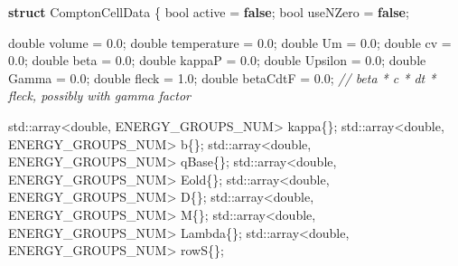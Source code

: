 \documentclass[
]{article}
\newenvironment{Shaded}{}{}
\newcommand{\BuiltInTok}[1]{\textcolor[rgb]{0.00,0.50,0.00}{#1}}
\newcommand{\CommentTok}[1]{\textcolor[rgb]{0.38,0.63,0.69}{\textit{#1}}}
\newcommand{\DataTypeTok}[1]{\textcolor[rgb]{0.56,0.13,0.00}{#1}}
\newcommand{\FloatTok}[1]{\textcolor[rgb]{0.25,0.63,0.44}{#1}}
\newcommand{\KeywordTok}[1]{\textcolor[rgb]{0.00,0.44,0.13}{\textbf{#1}}}
\newcommand{\NormalTok}[1]{#1}
\newcommand{\OperatorTok}[1]{\textcolor[rgb]{0.40,0.40,0.40}{#1}}
\begin{document}
\begin{Shaded}
\begin{Highlighting}[]
\KeywordTok{struct}\NormalTok{ ComptonCellData}
\OperatorTok{\{}
    \DataTypeTok{bool}\NormalTok{ active }\OperatorTok{=} \KeywordTok{false}\OperatorTok{;}
    \DataTypeTok{bool}\NormalTok{ useNZero }\OperatorTok{=} \KeywordTok{false}\OperatorTok{;}

    \DataTypeTok{double}\NormalTok{ volume }\OperatorTok{=} \FloatTok{0.0}\OperatorTok{;}
    \DataTypeTok{double}\NormalTok{ temperature }\OperatorTok{=} \FloatTok{0.0}\OperatorTok{;}
    \DataTypeTok{double}\NormalTok{ Um }\OperatorTok{=} \FloatTok{0.0}\OperatorTok{;}
    \DataTypeTok{double}\NormalTok{ cv }\OperatorTok{=} \FloatTok{0.0}\OperatorTok{;}
    \DataTypeTok{double}\NormalTok{ beta }\OperatorTok{=} \FloatTok{0.0}\OperatorTok{;}
    \DataTypeTok{double}\NormalTok{ kappaP }\OperatorTok{=} \FloatTok{0.0}\OperatorTok{;}
    \DataTypeTok{double}\NormalTok{ Upsilon }\OperatorTok{=} \FloatTok{0.0}\OperatorTok{;}
    \DataTypeTok{double}\NormalTok{ Gamma }\OperatorTok{=} \FloatTok{0.0}\OperatorTok{;}
    \DataTypeTok{double}\NormalTok{ fleck }\OperatorTok{=} \FloatTok{1.0}\OperatorTok{;}
    \DataTypeTok{double}\NormalTok{ betaCdtF }\OperatorTok{=} \FloatTok{0.0}\OperatorTok{;}      \CommentTok{// beta * c * dt * fleck, possibly with gamma factor}

    \BuiltInTok{std::}\NormalTok{array}\OperatorTok{\textless{}}\DataTypeTok{double}\OperatorTok{,}\NormalTok{ ENERGY\_GROUPS\_NUM}\OperatorTok{\textgreater{}}\NormalTok{ kappa}\OperatorTok{\{\};}
    \BuiltInTok{std::}\NormalTok{array}\OperatorTok{\textless{}}\DataTypeTok{double}\OperatorTok{,}\NormalTok{ ENERGY\_GROUPS\_NUM}\OperatorTok{\textgreater{}}\NormalTok{ b}\OperatorTok{\{\};}
    \BuiltInTok{std::}\NormalTok{array}\OperatorTok{\textless{}}\DataTypeTok{double}\OperatorTok{,}\NormalTok{ ENERGY\_GROUPS\_NUM}\OperatorTok{\textgreater{}}\NormalTok{ qBase}\OperatorTok{\{\};}
    \BuiltInTok{std::}\NormalTok{array}\OperatorTok{\textless{}}\DataTypeTok{double}\OperatorTok{,}\NormalTok{ ENERGY\_GROUPS\_NUM}\OperatorTok{\textgreater{}}\NormalTok{ Eold}\OperatorTok{\{\};}
    \BuiltInTok{std::}\NormalTok{array}\OperatorTok{\textless{}}\DataTypeTok{double}\OperatorTok{,}\NormalTok{ ENERGY\_GROUPS\_NUM}\OperatorTok{\textgreater{}}\NormalTok{ D}\OperatorTok{\{\};}
    \BuiltInTok{std::}\NormalTok{array}\OperatorTok{\textless{}}\DataTypeTok{double}\OperatorTok{,}\NormalTok{ ENERGY\_GROUPS\_NUM}\OperatorTok{\textgreater{}}\NormalTok{ M}\OperatorTok{\{\};}
    \BuiltInTok{std::}\NormalTok{array}\OperatorTok{\textless{}}\DataTypeTok{double}\OperatorTok{,}\NormalTok{ ENERGY\_GROUPS\_NUM}\OperatorTok{\textgreater{}}\NormalTok{ Lambda}\OperatorTok{\{\};}
    \BuiltInTok{std::}\NormalTok{array}\OperatorTok{\textless{}}\DataTypeTok{double}\OperatorTok{,}\NormalTok{ ENERGY\_GROUPS\_NUM}\OperatorTok{\textgreater{}}\NormalTok{ rowS}\OperatorTok{\{\};}


\end{Highlighting}
\end{Shaded}
\end{document}
